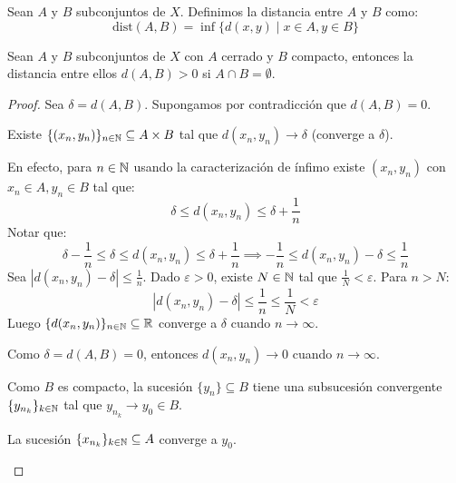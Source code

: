 \vspace{0.5cm}

\begin{definicion}
    Sean $A$ y $B$ subconjuntos de $X$. Definimos la distancia entre $A$ y $B$ como:
    \[\text{dist}(A, B) = \inf \{ d(x, y) \mid x \in A, y \in B \}\]
\end{definicion}

\begin{teorema}
    Sean $A$ y $B$ subconjuntos de $X$ con $A$ cerrado y $B$ compacto, entonces la distancia entre ellos $d(A, B) > 0$ si $A \cap B = \emptyset$.
\end{teorema}

\begin{proof}
    Sea $\delta = d(A, B)$. Supongamos por contradicción que $d(A, B) = 0$.
    
    \begin{afirmacion}
        Existe $\{(x_n, y_n)\}_{n \in \mathbb{N}} \subseteq A \times B$ tal que $d(x_n, y_n) \rightarrow \delta$ (converge a $\delta$).
    \end{afirmacion}
    
    \begin{prueba}
    En efecto, para $n \in \mathbb{N}$ usando la caracterización de ínfimo existe $(x_n, y_n)$ con $x_n \in A, y_n \in B$ tal que:
    \[\delta \le d(x_n, y_n) \le \delta + \frac{1}{n}\]
    Notar que:
    \[\delta - \frac{1}{n} \le \delta \le d(x_n, y_n) \le \delta + \frac{1}{n} \implies -\frac{1}{n} \le d(x_n, y_n) - \delta \le \frac{1}{n}\]
    Sea $|d(x_n, y_n) - \delta| \le \frac{1}{n}$. Dado $\varepsilon > 0$, existe $N \in \mathbb{N}$ tal que $\frac{1}{N} < \varepsilon$. Para $n > N$:
    \[|d(x_n, y_n) - \delta| \le \frac{1}{n} \le \frac{1}{N} < \varepsilon\]
    Luego $\{d(x_n, y_n)\}_{n \in \mathbb{N}} \subseteq \mathbb{R}$ converge a $\delta$ cuando $n \rightarrow \infty$.
    \end{prueba}
    
    Como $\delta = d(A, B) = 0$, entonces $d(x_n, y_n) \rightarrow 0$ cuando $n \rightarrow \infty$.
    
    Como $B$ es compacto, la sucesión $\{y_n\} \subseteq B$ tiene una subsucesión convergente $\{y_{n_k}\}_{k \in \mathbb{N}}$ tal que $y_{n_k} \rightarrow y_0 \in B$.
    
    \begin{afirmacion}
        La sucesión $\{x_{n_k}\}_{k \in \mathbb{N}} \subseteq A$ converge a $y_0$.
    \end{afirmacion}
    

\end{proof}
